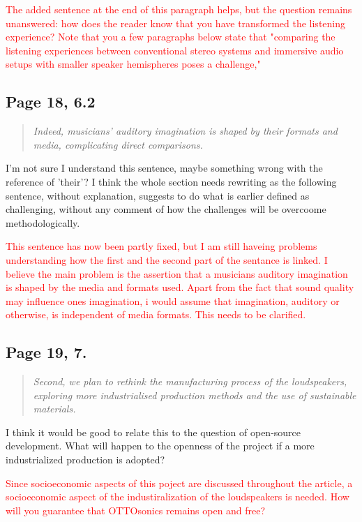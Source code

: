 \documentclass[11pt]{article}
\begin{document}
\textcolor{red}{The added sentence at the end of this paragraph helps, but the question remains unanswered: how does the reader know that you have transformed the listening experience? Note that you a few paragraphs below state that "comparing the listening experiences between conventional stereo systems and immersive audio setups with smaller speaker hemispheres poses a challenge,"}
\subsection*{Page 18, 6.2}
\label{sec:orgeff5ab6}
\begin{quote}
\emph{Indeed, musicians' auditory imagination is shaped by their formats and media, complicating direct comparisons.}
\end{quote}
I'm not sure I understand this sentence, maybe something wrong with the reference of 'their'? I think the whole section needs rewriting as the following sentence, without explanation, suggests to do what is earlier defined as challenging, without any comment of how the challenges will be overcoome methodologically.

\textcolor{red}{This sentence has now been partly fixed, but I am still haveing problems understanding how the first and the second part of the sentance is linked. I believe the main problem is the assertion that a musicians auditory imagination is shaped by the media and formats used. Apart from the fact that sound quality may influence ones imagination, i would assume that imagination, auditory or otherwise, is independent of media formats. This needs to be clarified. }
\subsection*{Page 19, 7.}
\label{sec:org1cd8018}
\begin{quote}
\emph{Second, we plan to rethink the
manufacturing process of the loudspeakers, exploring more industrialised production
methods and the use of sustainable materials.}
\end{quote}

I think it would be good to relate this to the question of open-source development. What will happen to the openness of the project if a more industrialized production is adopted?

\textcolor{red}{Since socioeconomic aspects of this poject are discussed throughout the article, a socioeconomic aspect of the industiralization of the loudspeakers is needed. How will you guarantee that OTTOsonics remains open and free?}
\end{document}
